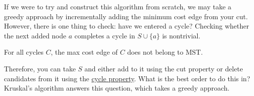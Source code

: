   If we were to try and construct this algorithm from scratch, we may take a greedy approach by incrementally adding the minimum cost edge from your cut. However, there is one thing to check: have we entered a cycle? Checking whether the next added node $a$ completes a cycle in $S \cup \{a\}$ is nontrivial. 

  \begin{theorem}
    \label{thm:cycle-property}
    For all cycles $C$, the max cost edge of $C$ does not belong to MST. 
  \end{theorem}

  Therefore, you can take $S$ and either add to it using the cut property or delete candidates from it using the \hyperref[thm:cycle-property]{cycle property}. What is the best order to do this in? Kruskal's algorithm answers this question, which takes a greedy approach. 

